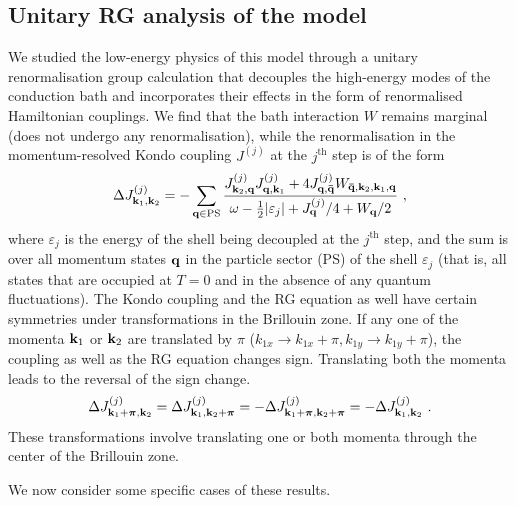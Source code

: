 \documentclass[reprint,hidelinks,onecolumn]{revtex4-2}
\begin{document}
\subsection{Unitary RG analysis of the model}
We studied the low-energy physics of this model through a unitary renormalisation group calculation that decouples the high-energy modes of the conduction bath and incorporates their effects in the form of renormalised Hamiltonian couplings. We find that the bath interaction \(W\) remains marginal (does not undergo any renormalisation), while the renormalisation in the momentum-resolved Kondo coupling \(J^{(j)}\) at the \(j^\text{th}\) step is of the form
\begin{equation}\begin{aligned}\label{KondoRGequation}
	\Delta J^{(j)}_{{\bf k}_1, {\bf k}_2} = -\sum_{{\bf q} \in \text{PS}} \frac{J^{(j)}_{{\bf k}_2,{\bf q}} J^{(j)}_{{\bf q},{\bf k}_1} + 4J^{(j)}_{{\bf q}, {\bf \bar q}} W_{{\bf \bar q}, {\bf k}_2, {\bf k}_1, {\bf q}}}{\omega - \frac{1}{2}|\varepsilon_j| + J^{(j)}_{{\bf q}}/4 + W_{{\bf q}}/2}~,
\end{aligned}\end{equation}
where \(\varepsilon_j\) is the energy of the shell being decoupled at the \(j^\text{th}\) step, and the sum is over all momentum states \({\bf q}\) in the particle sector (PS) of the shell \(\varepsilon_j\) (that is, all states that are occupied at \(T=0\) and in the absence of any quantum fluctuations). The Kondo coupling and the RG equation as well have certain symmetries under transformations in the Brillouin zone. If any one of the momenta \({\bf k}_1\) or \({\bf k}_2\) are translated by \(\pi\) (\(k_{1x} \to k_{1x} + \pi, k_{1y} \to k_{1y}+\pi\)), the coupling as well as the RG equation changes sign. Translating both the momenta leads to the reversal of the sign change. 
\begin{equation}\begin{aligned}\label{hamiltonanSymms}
	\Delta J^{(j)}_{{\bf k}_1 + \boldsymbol{\pi}, {\bf k}_2} = \Delta J^{(j)}_{{\bf k}_1, {\bf k}_2 + \boldsymbol{\pi}} = -\Delta J^{(j)}_{{\bf k}_1 + \boldsymbol{\pi}, {\bf k}_2 + \boldsymbol{\pi}} = -\Delta J^{(j)}_{{\bf k}_1, {\bf k}_2}~.
\end{aligned}\end{equation}
These transformations involve translating one or both momenta through the center of the Brillouin zone.

We now consider some specific cases of these results.
\end{document}
